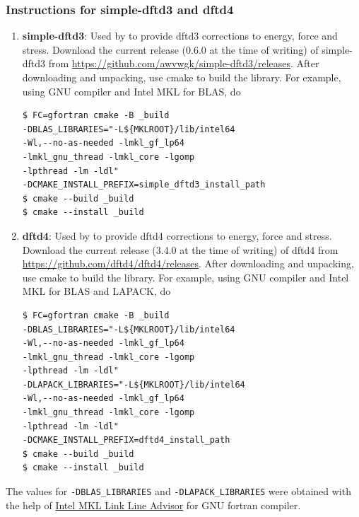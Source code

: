 \subsubsection{Instructions for simple-dftd3 and dftd4}

\begin{enumerate}
	\item   {\bf simple-dftd3}: Used by \dftfe{} to provide dftd3 corrections to energy, force and stress. Download the current release (0.6.0 at the time of writing) of simple-dftd3 from \url{https://github.com/awvwgk/simple-dftd3/releases}. After downloading and unpacking, use cmake to build the library. For example, using GNU compiler and Intel MKL for BLAS, do
\begin{verbatim}
$ FC=gfortran cmake -B _build 
-DBLAS_LIBRARIES="-L${MKLROOT}/lib/intel64 
-Wl,--no-as-needed -lmkl_gf_lp64 
-lmkl_gnu_thread -lmkl_core -lgomp 
-lpthread -lm -ldl" 
-DCMAKE_INSTALL_PREFIX=simple_dftd3_install_path
$ cmake --build _build
$ cmake --install _build 
\end{verbatim}
	\item   {\bf dftd4}: Used by \dftfe{} to provide dftd4 corrections to energy, force and stress. Download the current release (3.4.0 at the time of writing) of dftd4 from \url{https://github.com/dftd4/dftd4/releases}. After downloading and unpacking, use cmake to build the library. For example, using GNU compiler and Intel MKL for BLAS and LAPACK, do
\begin{verbatim}
$ FC=gfortran cmake -B _build 
-DBLAS_LIBRARIES="-L${MKLROOT}/lib/intel64 
-Wl,--no-as-needed -lmkl_gf_lp64 
-lmkl_gnu_thread -lmkl_core -lgomp 
-lpthread -lm -ldl" 
-DLAPACK_LIBRARIES="-L${MKLROOT}/lib/intel64 
-Wl,--no-as-needed -lmkl_gf_lp64 
-lmkl_gnu_thread -lmkl_core -lgomp 
-lpthread -lm -ldl" 
-DCMAKE_INSTALL_PREFIX=dftd4_install_path
$ cmake --build _build
$ cmake --install _build 
\end{verbatim}
\end{enumerate}
The values for \verb|-DBLAS_LIBRARIES| and \verb|-DLAPACK_LIBRARIES| were obtained with the help of \href{https://software.intel.com/en-us/articles/intel-mkl-link-line-advisor}{Intel MKL Link Line Advisor} for GNU fortran compiler.\\ 


